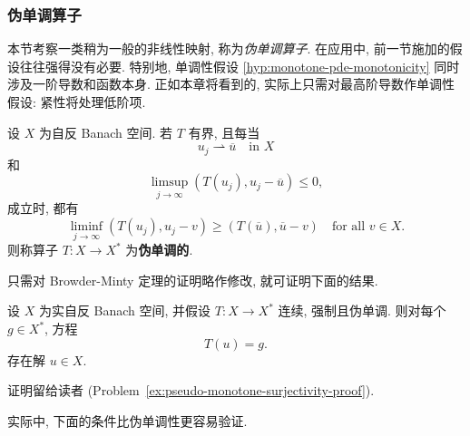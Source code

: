 \subsubsection{伪单调算子}\label{subsec:pseudo-monotone-operators}

本节考察一类稍为一般的非线性映射, 称为\emph{伪单调算子}. 在应用中, 前一节施加的假设往往强得没有必要. 特别地, 单调性假设 \ref{hyp:monotone-pde-monotonicity} 同时涉及一阶导数和函数本身. 正如本章将看到的, 实际上只需对最高阶导数作单调性假设: 紧性将处理低阶项.

\begin{Definition}
\label{def:pseudo-monotone-operator}
设 $X$ 为自反 Banach 空间. 若 $T$ 有界, 且每当
\begin{equation}\label{eq:pseudo-monotonicity-weak-sequence}
u_j\rightharpoonup\overline u\quad\text{in }X
\end{equation}
和
\begin{equation}\label{eq:pseudo-monotonicity-limsup-hypothesis}
\limsup_{j\to\infty}(T(u_j),u_j-\overline u)\leq0,
\end{equation}
成立时, 都有
\begin{equation}\label{eq:pseudo-monotonicity-liminf-conclusion}
\liminf_{j\to\infty}(T(u_j),u_j-v)\geq(T(\overline u),\overline u-v)\quad\text{for all }v\in X.
\end{equation}
则称算子 $T:X\to X^*$ 为\textbf{伪单调的}.
\end{Definition}

只需对 Browder-Minty 定理的证明略作修改, 就可证明下面的结果.

\begin{Theorem}
\label{thm:pseudo-monotone-surjectivity}
设 $X$ 为实自反 Banach 空间, 并假设 $T:X\to X^*$ 连续, 强制且伪单调. 则对每个 $g\in X^*$, 方程
\begin{equation}\label{eq:pseudo-monotone-surjectivity-equation}
T(u)=g.
\end{equation}
存在解 $u\in X$.
\end{Theorem}

证明留给读者 (Problem~\ref{ex:pseudo-monotone-surjectivity-proof}).

实际中, 下面的条件比伪单调性更容易验证.

